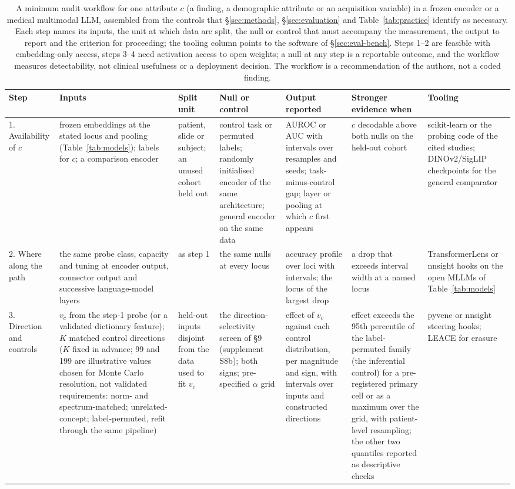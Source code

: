 \begin{table}[!tbp]
\centering\scriptsize\setlength\tabcolsep{3pt}\renewcommand{\arraystretch}{1.0}
\caption{A minimum audit workflow for one attribute $c$ (a finding, a demographic attribute or an acquisition variable) in a frozen encoder or a medical multimodal LLM, assembled from the controls that \S\ref{sec:methods}, \S\ref{sec:evaluation} and Table~\ref{tab:practice} identify as necessary. Each step names its inputs, the unit at which data are split, the null or control that must accompany the measurement, the output to report and the criterion for proceeding; the tooling column points to the software of \S\ref{sec:eval-bench}. Steps 1--2 are feasible with embedding-only access, steps 3--4 need activation access to open weights; a null at any step is a reportable outcome, and the workflow measures detectability, not clinical usefulness or a deployment decision. The workflow is a recommendation of the authors, not a coded finding.}
\label{tab:workflow}
\begin{tabular}{@{}L{1.6cm}L{2.6cm}L{1.45cm}L{2.95cm}L{2.6cm}L{1.95cm}L{1.8cm}@{}}
\toprule
Step & Inputs & Split unit & Null or control & Output reported & Stronger evidence when & Tooling \\
. Availability of $c$ & frozen embeddings at the stated locus and pooling (Table~\ref{tab:models}); labels for $c$; a comparison encoder & patient, slide or subject; an unused cohort held out & control task or permuted labels; randomly initialised encoder of the same architecture; general encoder on the same data & AUROC or AUC with intervals over resamples and seeds; task-minus-control gap; layer or pooling at which $c$ first appears & $c$ decodable above both nulls on the held-out cohort & scikit-learn or the probing code of the cited studies; DINOv2/SigLIP checkpoints for the general comparator \\
2. Where along the path & the same probe class, capacity and tuning at encoder output, connector output and successive language-model layers & as step 1 & the same nulls at every locus & accuracy profile over loci with intervals; the locus of the largest drop & a drop that exceeds interval width at a named locus & TransformerLens or nnsight hooks on the open MLLMs of Table~\ref{tab:models} \\
3. Direction and controls & $v_c$ from the step-1 probe (or a validated dictionary feature); $K$ matched control directions ($K$ fixed in advance; 99 and 199 are illustrative values chosen for Monte Carlo resolution, not validated requirements: norm- and spectrum-matched; unrelated-concept; label-permuted, refit through the same pipeline) & held-out inputs disjoint from the data used to fit $v_c$ & the direction-selectivity screen of \S9 (supplement S8b); both signs; pre-specified $\alpha$ grid & effect of $v_c$ against each control distribution, per magnitude and sign, with intervals over inputs and constructed directions & effect exceeds the 95th percentile of the label-permuted family (the inferential control) for a pre-registered primary cell or as a maximum over the grid, with patient-level resampling; the other two quantiles reported as descriptive checks & pyvene or nnsight steering hooks; LEACE for erasure \\

\end{tabular}
\end{table}

